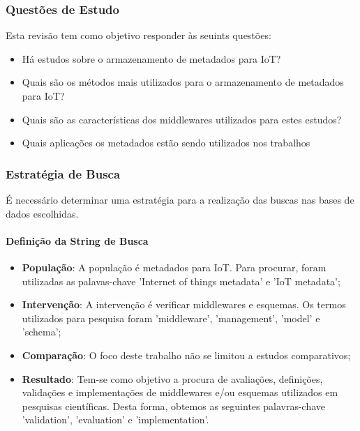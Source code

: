 \subsubsection{Questões de Estudo}
\quad Esta revisão tem como objetivo responder às seuints questões:
\begin{itemize}
  \item Há estudos sobre o armazenamento de metadados para \acrlong{IoT}?
  \item Quais são os métodos mais utilizados para o armazenamento de metadados para \acrshort{IoT}?
  \item Quais são as características dos middlewares utilizados para estes estudos?
  \item Quais aplicações os metadados estão sendo utilizados nos trabalhos
\end{itemize}

\subsubsection{Estratégia de Busca}
\quad É necessário determinar uma estratégia para a realização das buscas nas bases de dados escolhidas.

\paragraph{Definição da String de Busca}
\begin{itemize}
  \item \textbf{População}: A população é metadados para \acrshort{IoT}. Para procurar, foram utilizadas as palavas-chave 'Internet of things metadata' e 'IoT metadata';
  \item \textbf{Intervenção}: A intervenção é verificar middlewares e esquemas. Os termos utilizados para pesquisa foram 'middleware', 'management', 'model' e 'schema';
  \item \textbf{Comparação}: O foco deste trabalho não se limitou a estudos comparativos;
  \item \textbf{Resultado}: Tem-se como objetivo a procura de avaliações, definições, validações e implementações de middlewares e/ou esquemas utilizados em pesquisas científicas. Desta forma, obtemos as seguintes palavras-chave
  'validation', 'evaluation' e 'implementation'.
\end{itemize}

